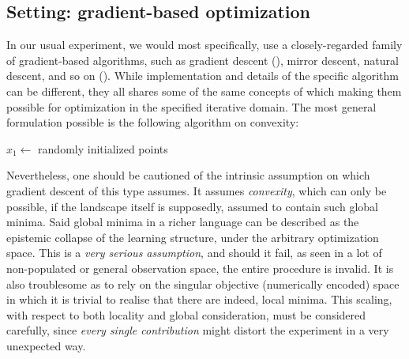 \documentclass[
  journal=largetwo,
  year=2025,
  volume=37,
]{cup-journal}
\begin{document}
\subsection{Setting: gradient-based optimization}

In our usual experiment, we would most specifically, use a closely-regarded family of gradient-based algorithms, such as gradient descent (\cite{Cauchy:1847,Robbins:1951,Widrow:1960,Hestenes:1952,Fletcher:1964}), mirror descent, natural descent, and so on (\cite{nemirovski_yudin_1983,amari_1996_natural_riemannian_gradient,amari_1998_natural_gradient_works,yang_amari_1998_complexity_issues_natural_gradient,amari_rattray_saad_1998_natural_gradient_online,gunasekar_woodworth_srebro_2021_mirrorless_mirror_descent,luong_parpas_rueckert_rustem_2016_weighted_mirror_descent,xiao_zhang_2014_proximal_stochastic_gradient,sohl-dickstein_2012_natural_gradient_whitening,raskutti_mukherjee_2013_information_geometry_mirror_descent}). While implementation and details of the specific algorithm can be different, they all shares some of the same concepts of which making them possible for optimization in the specified iterative domain. The most general formulation possible is the following algorithm on convexity:

\begin{algorithm}[htb]
    \caption{Gradient descent on general convex function}
    \Begin
    {
    $x_{1}\gets$ randomly initialized points\;
    }
    \label{algo:algo_gd}
\end{algorithm}
Nevertheless, one should be cautioned of the intrinsic assumption on which gradient descent of this type assumes. It assumes \textit{convexity}, which can only be possible, if the landscape itself is supposedly, assumed to contain such global minima. Said global minima in a richer language can be described as the epistemic collapse of the learning structure, under the arbitrary optimization space. This is a \textit{very serious assumption}, and should it fail, as seen in a lot of non-populated or general observation space, the entire procedure is invalid. It is also troublesome as to rely on the singular objective (numerically encoded) space in which it is trivial to realise that there are indeed, local minima. This scaling, with respect to both locality and global consideration, must be considered carefully, since \textit{every single contribution} might distort the experiment in a very unexpected way. 
\end{document}
